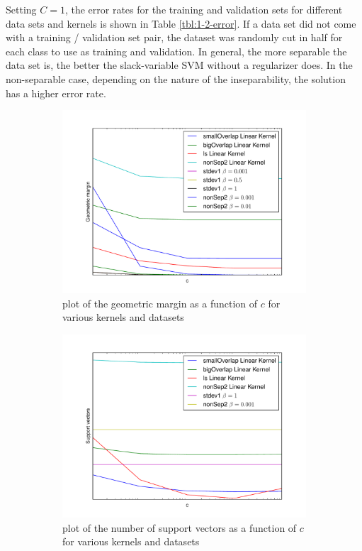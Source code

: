 \documentclass[10pt]{article}
\begin{document}
Setting $C = 1$, the error rates for the training and validation sets for different data sets and kernels is shown in Table \ref{tbl:1-2-error}. If a data set did not come with a training / validation set pair, the dataset was randomly cut in half for each class to use as training and validation. In general, the more separable the data set is, the better the slack-variable SVM without a regularizer does. In the non-separable case, depending on the nature of the inseparability, the solution has a higher error rate.

\begin{figure}[!ht]
\centering
\begin{subfigure}[b]{0.46\textwidth}
	\centering
	\includegraphics[width=\textwidth]{1-3-c-margin.pdf}
	\caption{plot of the geometric margin as a function of $c$ for various kernels and datasets}
	\label{fig:1-3-c-margin}
\end{subfigure}
\begin{subfigure}[b]{0.46\textwidth}
	\centering
	\includegraphics[width=\textwidth]{1-3-support-vectors.pdf}
	\caption{plot of the number of support vectors as a function of $c$ for various kernels and datasets}
	\label{fig:1-3-support-vectors}
\end{subfigure}
\caption{}
\label{fig:1-3-all}
\end{figure}
\end{document}
